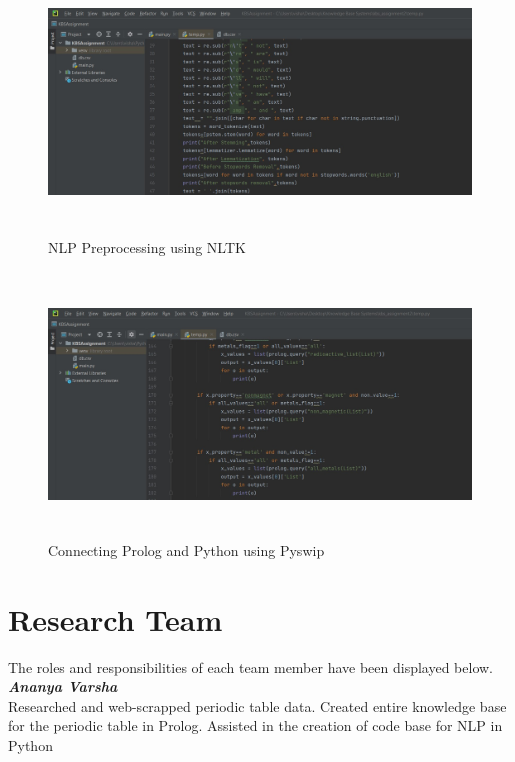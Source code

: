 \documentclass{article}
\begin{document}
\begin{figure}[htp]
    \centering
    \includegraphics[width=15cm, height = 7cm]{Images/sc-8.jpg}
    \caption{NLP Preprocessing using NLTK}
    \label{fig: Example 9}
\end{figure}

\begin{figure}[htp]
    \centering
    \includegraphics[width=15cm, height = 7cm]{Images/sc-9.jpg}
    \caption{Connecting Prolog and Python using Pyswip}
    \label{fig: Example 10}
\end{figure}


\newpage
\section{Research Team}
The roles and responsibilities of each team member have been displayed below.\\

\textbf{\textit{Ananya Varsha}}\\
Researched and web-scrapped periodic table data. Created entire knowledge base for the periodic table in Prolog. Assisted in the creation of code base for NLP in Python\\ 
\end{document}
